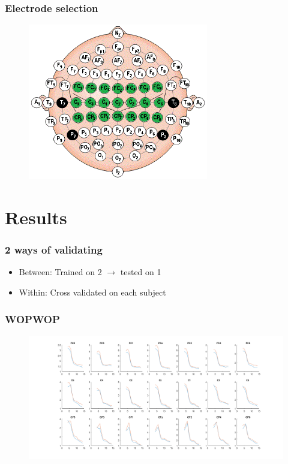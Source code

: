\documentclass{beamer}
\begin{document}
\begin{frame}
  \frametitle{Electrode selection}

 \begin{figure}
  \centering
     \includegraphics[width=0.7\textwidth]{cap.png}
 \end{figure}

\end{frame}



\section{Results}

\begin{frame}

\frametitle{2 ways of validating}
 \begin{itemize}
   \item Between: Trained on 2 $\rightarrow$ tested on 1
   \item Within: Cross validated on each subject
 \end{itemize}

\end{frame}

\begin{frame}
  \frametitle{WOPWOP}

 \begin{figure}
  \centering
     \includegraphics[width=1.0\textwidth]{distinction.png}
 \end{figure}

\end{frame}
\end{document}
